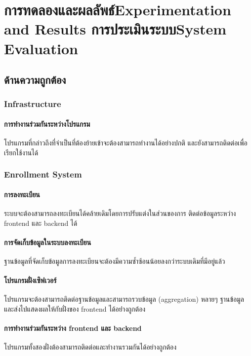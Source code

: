 \chapter{\ifproject%
\ifcpe การทดลองและผลลัพธ์\else Experimentation and Results\fi
\else%
\ifcpe การประเมินระบบ\else System Evaluation\fi
\fi}

\section{ด้านความถูกต้อง}

\subsection{Infrastructure}

\subsubsection{การทำงานร่วมกันระหว่างโปรแกรม}

โปรแกรมที่กล่าวถึงที่จำเป็นที่ต้องย้ายเข้าจะต้องสามารถทำงานได้อย่างปกติ และยังสามารถติดต่อเพื่อเรียกใช้งานได้

\subsection{Enrollment System}

\subsubsection{การลงทะเบียน}

ระบบจะต้องสามารถลงทะเบียนได้คล้ายเดิมโดยการปรับแต่งในส่วนของการ ติดต่อข้อมูลระหว่าง frontend และ backend ได้

\subsubsection{การจัดเก็บข้อมูลในระบบลงทะเบียน}

ฐานข้อมูลที่จัดเก็บข้อมูลการลงทะเบียนจะต้องมีความซ้ำซ้อนน้อยลงกว่าระบบเดิมที่มีอยู่แล้ว

\subsubsection{โปรแกรมฝั่งเซิฟเวอร์}

โปรแกรมจะต้องสามารถติดต่อฐานข้อมูลและสามารถรวบข้อมูล (aggregation) หลายๆ ฐานข้อมูลและส่งไปแสดงผลให้กับฝั่งของ frontend ได้อย่่างถูกต้อง

\subsubsection{การทำงานร่วมกันระหว่าง frontend และ backend}

โปรแกรมทั้งสองฝั่งต้องสามารถติดต่อและทำงานรวมกันได้อย่างถูกต้อง
